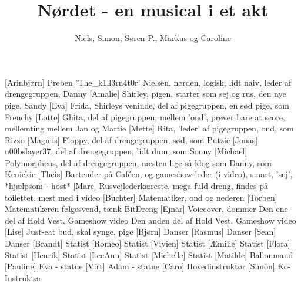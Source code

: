 \documentclass[a4paper,11pt]{article}
\title{Nørdet - en musical i et akt}
\author{Niels, Simon, Søren P., Markus og Caroline}
\begin{document}
\maketitle

\begin{roles}
  [Arinbjørn] Preben 'The\_k1ll3rn4t0r' Nielsen, nørden, logisk, lidt naiv, leder af drengegruppen, Danny
  [Amalie] Shirley, pigen, starter som sej og rus, den nye pige, Sandy
  [Eva] Frida, Shirleys veninde, del af pigegruppen, en sød pige, som Frenchy
  [Lotte] Ghita, del af pigegruppen, mellem 'ond', prøver bare at score, mellemting mellem Jan og Martie
  [Mette] Rita, 'leder' af pigegruppen, ond, som Rizzo
  [Magnus] Floppy, del af drengegruppen, sød, som Putzie
  [Jonas] n00bslayer37, del af drengegruppen, lidt dum, som Sonny
  [Michael] Polymorpheus, del af drengegruppen, næsten lige så klog som Danny, som Kenickie
  [Theis] Bartender på Caféen, og gameshow-leder (i video), smart, 'sej', *hjælpsom - host*
  [Marc] Rusvejlederkæreste, mega fuld dreng, findes på toilettet, mest med i video
  [Buchter] Matematiker, ond og nederen
  [Torben] Matematikeren følgesvend, tænk BitDreng
  [Ejnar] Voiceover, dommer
   Den ene del af Hold Vest, Gameshow video
   Den anden del af Hold Vest, Gameshow video
  [Lise] Just-eat bud, skal synge, pige
  [Bjørn] Danser
  [Rasmus] Danser
  [Sean] Danser
  [Brandt] Statist
  [Romeo] Statist
  [Vivien] Statist
  [Æmilie] Statist
  [Flora] Statist
  [Henrik] Statist
  [LeeAnn] Statist
  [Michelle] Statist
  [Matilde] Ballonmand
  [Pauline] Eva - statue
  [Virt] Adam - statue
  [Caro] Hovedinstruktør
  [Simon] Ko-Instruktør
\end{roles}
\end{document}
